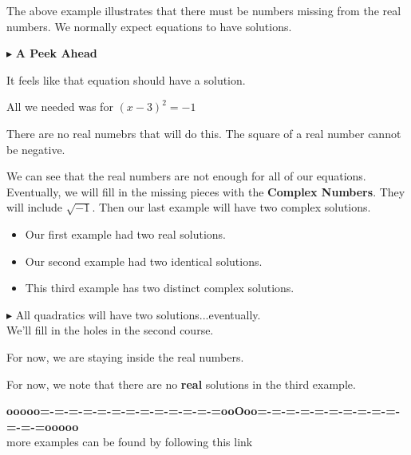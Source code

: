 \documentclass{ximera}
\begin{document}
The above example illustrates that there must be numbers missing from the real numbers.  We normally expect equations to have solutions. 


$\blacktriangleright$  \textbf{\textcolor{purple!85!blue}{A Peek Ahead}} 



It feels like that equation should have a solution.  


All we needed was for $(x-3)^2 = -1$ 

There are no real numebrs that will do this.  The square of a real number cannot be negative. 




We can see that the real numbers are not enough for all of our equations.  Eventually, we will fill in the missing pieces with the \textbf{Complex Numbers}.  They will include $\sqrt{-1}$.  Then our last example will have two complex solutions.  


\begin{itemize}
\item Our first example had two real solutions.  
\item Our second example had two identical solutions.  
\item This third example has two distinct complex solutions. 
\end{itemize}



$\blacktriangleright$ All quadratics will have two solutions...eventually. \\

We'll fill in the holes in the second course.









For now, we are staying inside the real numbers.



For now, we note that there are no \textbf{real} solutions in the third example.

























\begin{center}
\textbf{\textcolor{green!50!black}{ooooo=-=-=-=-=-=-=-=-=-=-=-=-=ooOoo=-=-=-=-=-=-=-=-=-=-=-=-=ooooo}} \\

more examples can be found by following this link\\ 

\end{center}
\end{document}
